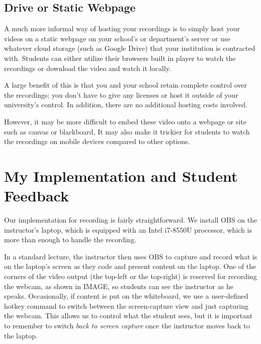 \documentclass[sigconf]{acmart}
\begin{document}
\subsection{Drive or Static Webpage}
A much more informal way of hosting your recordings is to simply host your videos on a static webpage on your school's or department's server or use whatever cloud storage (such as Google Drive) that your institution is contracted with.
Students can either utilize their browsers built in player to watch the recordings or download the video and watch it locally.

A large benefit of this is that you and your school retain complete control over the recordings; you don't have to give any licenses or host it outside of your university's control.
In addition, there are no additional hosting costs involved.

However, it may be more difficult to embed these video onto a webpage or site such as canvas or blackboard, 
It may also make it trickier for students to watch the recordings on mobile devices compared to other options.


%
%
%


\section{My Implementation and Student Feedback}

Our implementation for recording is fairly straightforward.
We install OBS \cite{bailey2017open} on the instructor's laptop, which is equipped with an Intel i7-8550U processor, which is more than enough to handle the recording.

In a standard lecture, the instructor then uses OBS to capture and record what is on the laptop's screen as they code and present content on the laptop.
One of the corners of the video output (the top-left or the top-right) is reserved for recording the webcam, as shown in IMAGE, so students can see the instructor as he speaks.
Occasionally, if content is put on the whiteboard, we use a user-defined hotkey command to switch between the screen-capture view and just capturing the webcam.
This allows us to control what the student sees, but it is important to remember to switch \textit{back to screen capture} once the instructor moves back to the laptop.  
\end{document}
